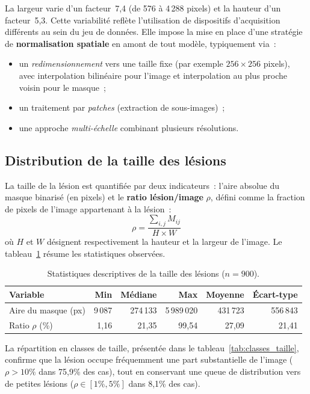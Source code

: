 \documentclass[12pt,a4paper]{article}
\begin{document}
La largeur varie d'un facteur~7,4 (de 576 à 4\,288 pixels) et la hauteur d'un facteur~5,3. Cette variabilité reflète l'utilisation de dispositifs d'acquisition différents au sein du jeu de données. Elle impose la mise en place d'une stratégie de \textbf{normalisation spatiale} en amont de tout modèle, typiquement via~:
\begin{itemize}[nosep]
    \item un \emph{redimensionnement} vers une taille fixe (par exemple $256 \times 256$ pixels), avec interpolation bilinéaire pour l'image et interpolation au plus proche voisin pour le masque~;
    \item un traitement par \emph{patches} (extraction de sous-images)~;
    \item une approche \emph{multi-échelle} combinant plusieurs résolutions.
\end{itemize}

\subsection{Distribution de la taille des lésions}
\label{subsec:taille}

La taille de la lésion est quantifiée par deux indicateurs~: l'aire absolue du masque binarisé (en pixels) et le \textbf{ratio lésion/image} $\rho$, défini comme la fraction de pixels de l'image appartenant à la lésion~:
\begin{equation}
    \rho = \frac{\sum_{i,j} M_{ij}}{H \times W}
    \label{eq:ratio}
\end{equation}
où $H$ et $W$ désignent respectivement la hauteur et la largeur de l'image. Le tableau~\ref{tab:taille_lesion} résume les statistiques observées.

\begin{table}[H]
\centering
\caption{Statistiques descriptives de la taille des lésions ($n = 900$).}
\label{tab:taille_lesion}
\begin{tabular}{l r r r r r}
\toprule
\textbf{Variable} & \textbf{Min} & \textbf{Médiane} & \textbf{Max} & \textbf{Moyenne} & \textbf{Écart-type} \\
\midrule
Aire du masque (px) & 9\,087 & 274\,133 & 5\,989\,020 & 431\,723 & 556\,843 \\
Ratio $\rho$ (\%) & 1,16 & 21,35 & 99,54 & 27,09 & 21,41 \\
\bottomrule
\end{tabular}
\end{table}

La répartition en classes de taille, présentée dans le tableau~\ref{tab:classes_taille}, confirme que la lésion occupe fréquemment une part substantielle de l'image ($\rho > 10\%$ dans 75,9\% des cas), tout en conservant une queue de distribution vers de petites lésions ($\rho \in [1\%, 5\%]$ dans 8,1\% des cas).
\end{document}
